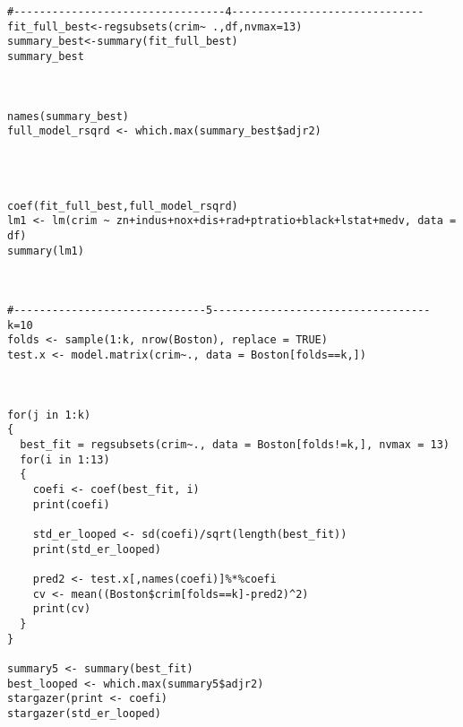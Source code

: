 \documentclass{article}
\begin{document}
\begin{verbatim}
#---------------------------------4------------------------------
fit_full_best<-regsubsets(crim~ .,df,nvmax=13)
summary_best<-summary(fit_full_best)
summary_best



names(summary_best)
full_model_rsqrd <- which.max(summary_best$adjr2)




coef(fit_full_best,full_model_rsqrd)
lm1 <- lm(crim ~ zn+indus+nox+dis+rad+ptratio+black+lstat+medv, data = df)
summary(lm1)



#------------------------------5----------------------------------
k=10
folds <- sample(1:k, nrow(Boston), replace = TRUE)
test.x <- model.matrix(crim~., data = Boston[folds==k,])



for(j in 1:k)
{
  best_fit = regsubsets(crim~., data = Boston[folds!=k,], nvmax = 13)
  for(i in 1:13)
  {
    coefi <- coef(best_fit, i)
    print(coefi)
    
    std_er_looped <- sd(coefi)/sqrt(length(best_fit))
    print(std_er_looped)
    
    pred2 <- test.x[,names(coefi)]%*%coefi
    cv <- mean((Boston$crim[folds==k]-pred2)^2)
    print(cv)
  }
}

summary5 <- summary(best_fit)
best_looped <- which.max(summary5$adjr2)
stargazer(print <- coefi)
stargazer(std_er_looped)
\end{verbatim}
\end{document}
